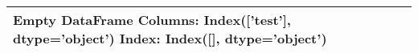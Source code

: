 \begin{tabular}{ll}
\toprule
Empty DataFrame
Columns: Index(['test'], dtype='object')
Index: Index([], dtype='object') \\
\bottomrule
\end{tabular}
